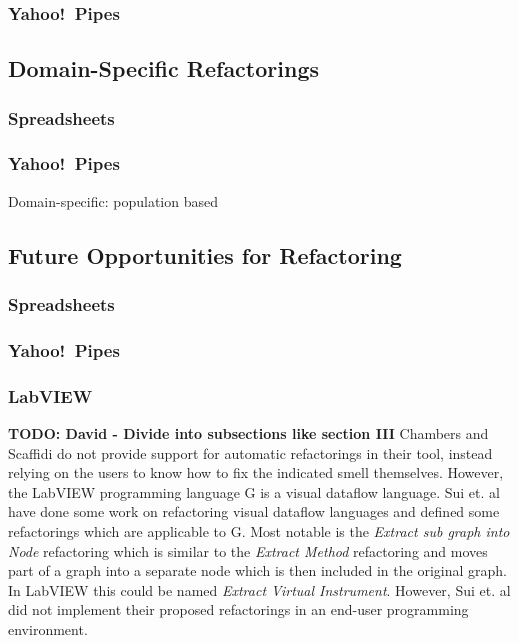 \documentclass[10pt,conference,compsocconf]{IEEEtran}
\newcommand{\todo}[1]{\textbf{TODO: #1}}
\begin{document}
\subsubsection{Yahoo!\ Pipes}

\subsection{Domain-Specific Refactorings}

\subsubsection{Spreadsheets}
\subsubsection{Yahoo!\ Pipes}

Domain-specific: population based


\subsection{Future Opportunities for Refactoring}
\subsubsection{Spreadsheets}
\subsubsection{Yahoo!\ Pipes}
\subsubsection{LabVIEW}
\todo{David - Divide into subsections like section III}
Chambers and Scaffidi \cite{chambers2013smell} do not provide support for automatic refactorings in their tool, instead relying on the users to know how to fix the indicated smell themselves.
However, the LabVIEW programming language G is a visual dataflow language.
Sui et. al \cite{sui2008automated} have done some work on refactoring visual dataflow languages and defined some refactorings which are applicable to G.
Most notable is the \textit{Extract sub graph into Node} refactoring which is similar to the \textit{Extract Method} refactoring and moves part of a graph into a separate node which is then included in the original graph.
In LabVIEW this could be named \textit{Extract Virtual Instrument}.
However, Sui et. al did not implement their proposed refactorings in an end-user programming environment.
\end{document}
